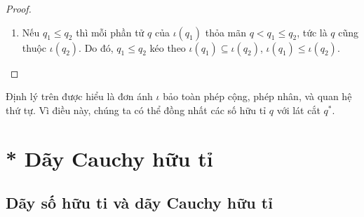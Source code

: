 \begin{proof}
\begin{enumerate}[label={(\roman*)}]
\begin{enumerate}[label={\textbf{Trường hợp \arabic*.}},itemindent=2cm]
                        Như vậy $\iota(q_{1}q_{2}) = \iota(q_{1})\iota(q_{2})$ với mọi số hữu tỉ âm $q_{1}$ và số hữu tỉ dương $q_{2}$.
                  \item  $q_{1} < 0$ và $q_{2} < 0$.
                        \begin{align*}
                            \iota(q_{1}q_{2}) & = \iota((-q_{1})(-q_{2}))                                                                          \\
                                              & = \iota(-q_{1})\iota(-q_{2})      & \text{(theo \textbf{Trường hợp 2})}                            \\
                                              & = (-\iota(q_{1}))(-\iota(-q_{2}))                                                                  \\
                                              & = \iota(q_{1})\iota(q_{2})        & \text{(theo Mệnh đề~\ref{proposition:dedekind-cuts-and-sign})}
                        \end{align*}

                        Như vậy $\iota(q_{1}q_{2}) = \iota(q_{1})\iota(q_{2})$ với mọi số hữu tỉ âm $q_{1}, q_{2}$.
              \end{enumerate}

              Vậy $\iota(q_{1}q_{2}) = \iota(q_{1})\iota(q_{2})$ với mọi số hữu tỉ $q_{1}, q_{2}$.
        \item Nếu $q_{1}\leq q_{2}$ thì mỗi phần tử $q$ của $\iota(q_{1})$ thỏa mãn $q < q_{1}\leq q_{2}$, tức là $q$ cũng thuộc $\iota(q_{2})$. Do đó, $q_{1}\leq q_{2}$ kéo theo $\iota(q_{1})\subseteq \iota(q_{2})$, $\iota(q_{1})\leq \iota(q_{2})$.
    \end{enumerate}
\end{proof}

Định lý trên được hiểu là đơn ánh $\iota$ bảo toàn phép cộng, phép nhân, và quan hệ thứ tự. Vì điều này, chúng ta có thể đồng nhất các số hữu tỉ $q$ với lát cắt $q^{*}$.

\section{* Dãy Cauchy hữu tỉ}\label{section:rational-cauchy-sequences}

\subsection{Dãy số hữu ti và dãy Cauchy hữu tỉ}

